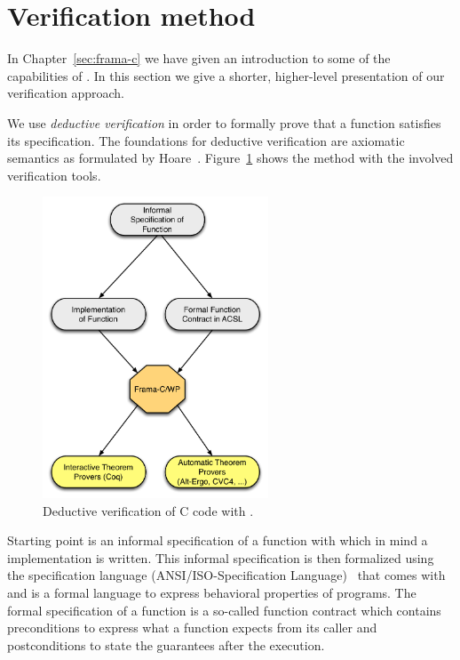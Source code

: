 \clearpage

\section{Verification method}
\label{sec:verification-method}
\label{method}

In Chapter~\ref{sec:frama-c} we have given an introduction
to some of the capabilities of \framacwp.
In this section we give a shorter, higher-level presentation 
of our verification approach.

We use \emph{deductive verification} in order to 
formally prove that a function satisfies its specification.
The foundations for deductive verification are axiomatic semantics as formulated
by Hoare~\cite{HoareCalculus}.
Figure~\ref{fig:method} shows the method with the involved verification tools.

\begin{figure}[hbt]
\centering
\includegraphics[width=0.60\textwidth]{figures/deductive-verification.pdf}
\caption{\label{fig:method} Deductive verification of C code with \framacwp.}
\end{figure}

Starting point is an informal specification of a function with which in mind
a implementation is written.
This informal specification is then formalized using the specification language
\acsl (ANSI\slash ISO-\isoc Specification Language)~\cite{acsl}
that comes with \framac and
is a formal language to express behavioral properties of \isoc programs.
The formal specification of a function is a so-called function contract
which contains preconditions to express what a function expects from its caller
and postconditions to state the guarantees after the execution.

